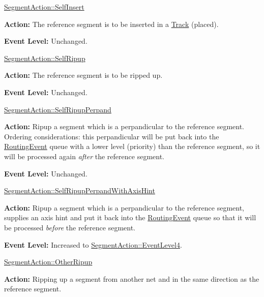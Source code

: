 \begin{DoxyItemize}
\item \hyperlink{classKite_1_1SegmentAction_a1d1cfd8ffb84e947f82999c682b666a7a930d0718b2afc37983ffe708f8261b19}{Segment\-Action\-::\-Self\-Insert}\par
 {\bfseries Action\-:} The reference segment is to be inserted in a \hyperlink{classKite_1_1Track}{Track} (placed).\par
 {\bfseries Event Level\-:} Unchanged.
\item \hyperlink{classKite_1_1SegmentAction_a1d1cfd8ffb84e947f82999c682b666a7a837e07a8b4101cff32018683072f2d78}{Segment\-Action\-::\-Self\-Ripup}\par
 {\bfseries Action\-:} The reference segment is to be ripped up.\par
 {\bfseries Event Level\-:} Unchanged.
\item \hyperlink{classKite_1_1SegmentAction_a1d1cfd8ffb84e947f82999c682b666a7a85fd77114c99a0827e08de2fc6a53ed7}{Segment\-Action\-::\-Self\-Ripup\-Perpand}\par
 {\bfseries Action\-:} Ripup a segment which is a perpandicular to the reference segment. Ordering considerations\-: this perpandicular will be put back into the \hyperlink{classKite_1_1RoutingEvent}{Routing\-Event} queue with a lower level (priority) than the reference segment, so it will be processed again {\itshape after} the reference segment.\par
 {\bfseries Event Level\-:} Unchanged.
\item \hyperlink{classKite_1_1SegmentAction_a1d1cfd8ffb84e947f82999c682b666a7ae30745ee276038ba4d7b5f92d80f3715}{Segment\-Action\-::\-Self\-Ripup\-Perpand\-With\-Axis\-Hint}\par
 {\bfseries Action\-:} Ripup a segment which is a perpandicular to the reference segment, supplies an axis hint and put it back into the \hyperlink{classKite_1_1RoutingEvent}{Routing\-Event} queue so that it will be processed {\itshape before} the reference segment.\par
 {\bfseries Event Level\-:} Increased to \hyperlink{classKite_1_1SegmentAction_a1d1cfd8ffb84e947f82999c682b666a7ab8346062d5bbccb98893c4675b8d5098}{Segment\-Action\-::\-Event\-Level4}.
\item \hyperlink{classKite_1_1SegmentAction_a1d1cfd8ffb84e947f82999c682b666a7a22374bab829fac7d12af4784d80eeb6e}{Segment\-Action\-::\-Other\-Ripup}\par
 {\bfseries Action\-:} Ripping up a segment from another net and in the same direction as the reference segment.\par

\end{DoxyItemize}
